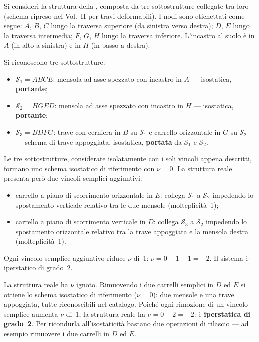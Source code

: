 \begin{esempio}
	\label{ex:decomposizione_riduzione}
	Si consideri la struttura della
	, composta da
	tre sottostrutture collegate tra loro (schema ripreso nel Vol.~II per travi deformabili). I nodi sono
	etichettati come segue: $A$, $B$, $C$ lungo la
	traversa superiore (da sinistra verso destra);
	$D$, $E$ lungo la traversa intermedia; $F$, $G$,
	$H$ lungo la traversa inferiore. L'incastro al
	suolo è in $A$ (in alto a sinistra) e in $H$
	(in basso a destra).
	


	
	
	
	Si riconoscono tre sottostrutture:
	\begin{itemize}[nosep]
		\item $\mathcal{S}_1 = ABCE$: mensola ad asse
		spezzato con incastro in $A$ --- isostatica,
		\textbf{portante};
		\item $\mathcal{S}_2 = HGED$: mensola ad asse
		spezzato con incastro in $H$ --- isostatica,
		\textbf{portante};
		\item $\mathcal{S}_3 = BDFG$: trave con cerniera
		in $B$ su $\mathcal{S}_1$ e carrello orizzontale
		in $G$ su $\mathcal{S}_2$ --- schema di trave
		appoggiata, isostatica, \textbf{portata} da
		$\mathcal{S}_1$ e $\mathcal{S}_2$.
	\end{itemize}
	
	Le tre sottostrutture, considerate isolatamente con
	i soli vincoli appena descritti, formano uno schema
	isostatico di riferimento con $\nu = 0$. La struttura
	reale presenta però due vincoli semplici aggiuntivi:
	\begin{itemize}[nosep]
		\item carrello a piano di scorrimento orizzontale
		in $E$: collega $\mathcal{S}_1$ a $\mathcal{S}_2$
		impedendo lo spostamento verticale relativo tra
		le due mensole (molteplicità~1);
		\item carrello a piano di scorrimento verticale
		in $D$: collega $\mathcal{S}_3$ a $\mathcal{S}_2$
		impedendo lo spostamento orizzontale relativo tra
		la trave appoggiata e la mensola destra
		(molteplicità~1).
	\end{itemize}
	Ogni vincolo semplice aggiuntivo riduce $\nu$ di~1:
	$\nu = 0 - 1 - 1 = -2$. Il sistema è
	iperstatico di grado~2.
	
	La struttura reale ha $\nu$ ignoto. Rimuovendo i due
	carrelli semplici in $D$ ed $E$ si ottiene lo schema
	isostatico di riferimento ($\nu = 0$): due mensole e
	una trave appoggiata, tutte riconoscibili nel catalogo.
	Poiché ogni rimozione di un vincolo semplice aumenta
	$\nu$ di~1, la struttura reale ha
	$\nu = 0 - 2 = -2$: è \textbf{iperstatica di grado~2}.
	Per ricondurla all'isostaticità bastano due operazioni
	di rilascio --- ad esempio rimuovere i due carrelli
	in $D$ ed $E$.
	

\end{esempio}
